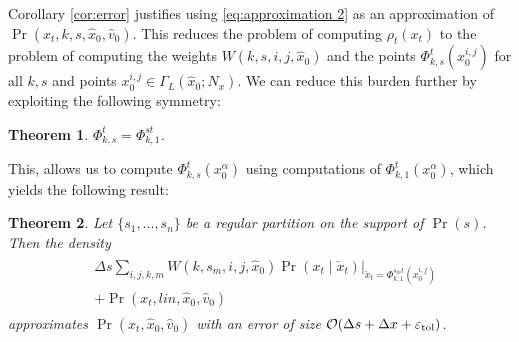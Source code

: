\documentclass[letterpaper,10pt,conference]{ieeeconf}
\newtheorem{thm}{Theorem}
\begin{document}
Corollary \ref{cor:error} justifies using \eqref{eq:approximation 2} as an approximation of $\Pr( x_t, k,s,\hat{x}_0, \hat{v}_0)$.
This reduces the problem of computing $\rho_t(x_t)$ to the problem of computing the weights $W(k,s,i,j,\hat{x}_0)$ and the points $\Phi_{k,s}^t(x_0^{i,j})$ for all $k,s$ and points $x_0^{i,j} \in \Gamma_L( \hat{x}_0; N_x)$.
We can reduce this burden further by exploiting the following symmetry:
\begin{thm} \label{thm:symmetry}
	$\Phi_{k,s}^t = \Phi_{k,1}^{st}$.
\end{thm}
This, allows us to compute $\Phi_{k,s}^t( x_0^{\alpha})$ using computations of $\Phi_{k,1}^t(x_0^{\alpha})$, which yields the following result:
\begin{thm} \label{thm:main}
	Let $\{s_1,\dots,s_n\}$ be a regular partition on the support of $\Pr(s)$.
	Then the density
	\begin{align}
		\begin{split}
		&\Delta s \sum_{i,j,k,m} W(k,s_m,i,j,\hat{x}_0) \left. \Pr( x_t \mid \check{x}_t ) \right|_{ \check{x}_t = \Phi_{k,1}^{s_m t}( x_0^{i,j}) } \\
		&+\Pr( x_t , lin, \hat{x}_0, \hat{v}_0 )
		\end{split}
		\label{eq:approximation 3}
	\end{align}
	approximates $\Pr( x_t, \hat{x}_0, \hat{v}_0)$ with an error of size $\mathcal{O}( \Delta s + \Delta x + \varepsilon_{\rm tol})$.
\end{thm}
\end{document}
